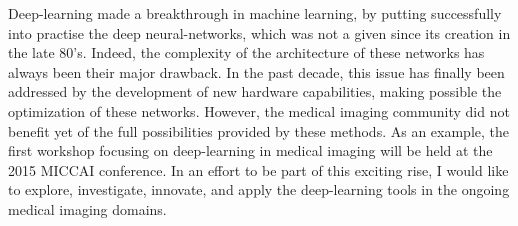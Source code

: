 \documentclass[a4paper]{article}
\begin{document}
Deep-learning made a breakthrough in machine learning, by putting successfully into practise the deep neural-networks, which was not a given since its creation in the late 80's. 
Indeed, the complexity of the architecture of these networks has always been their major drawback.
In the past decade, this issue has finally been addressed by the development of new hardware capabilities, making possible the optimization of these networks.
However, the medical imaging community did not benefit yet of the full possibilities provided by these methods.
As an example, the first workshop focusing on deep-learning in medical imaging will be held at the 2015 MICCAI conference.
In an effort to be part of this exciting rise, I would like to explore, investigate, innovate, and apply the deep-learning tools in the ongoing medical imaging domains.
\end{document}
